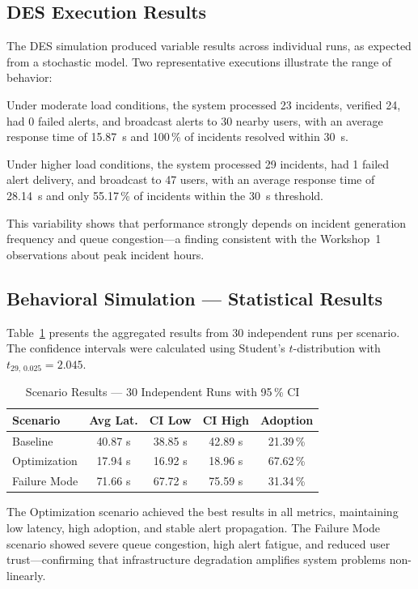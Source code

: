 \documentclass[conference,a4paper,10pt]{IEEEtran}
\begin{document}
\subsection{DES Execution Results}

The DES simulation produced variable results across individual runs,
as expected from a stochastic model. Two representative executions
illustrate the range of behavior:

Under moderate load conditions, the system processed 23 incidents, verified 24, had 0
failed alerts, and broadcast alerts to 30 nearby users, with an average response
time of 15.87~s and 100\,\% of incidents resolved within 30~s.

Under higher load conditions, the system processed 29 incidents, had 1 failed alert
delivery, and broadcast to 47 users, with an average response time of 28.14~s and
only 55.17\,\% of incidents within the 30~s threshold.

This variability shows that performance strongly depends on incident
generation frequency and queue congestion---a finding consistent with
the Workshop~1 observations about peak incident hours.

\subsection{Behavioral Simulation --- Statistical Results}

Table~\ref{tab:results} presents the aggregated results from 30
independent runs per scenario. The confidence intervals were
calculated using Student's $t$-distribution with
$t_{29,\,0.025} = 2.045$.

\begin{table}[H]
\caption{Scenario Results --- 30 Independent Runs with 95\,\% CI}
\label{tab:results}\centering\small
\begin{tabular}{lcccc}
\toprule
\textbf{Scenario} & \textbf{Avg Lat.} &
\textbf{CI Low} & \textbf{CI High} & \textbf{Adoption}\\
\midrule
Baseline     & 40.87 s & 38.85 s & 42.89 s & 21.39\,\%\\
Optimization & 17.94 s & 16.92 s & 18.96 s & 67.62\,\%\\
Failure Mode & 71.66 s & 67.72 s & 75.59 s & 31.34\,\%\\
\bottomrule
\end{tabular}
\end{table}

The Optimization scenario achieved the best results in all metrics,
maintaining low latency, high adoption, and stable alert propagation.
The Failure Mode scenario showed severe queue congestion, high alert
fatigue, and reduced user trust---confirming that infrastructure
degradation amplifies system problems non-linearly.
\end{document}
